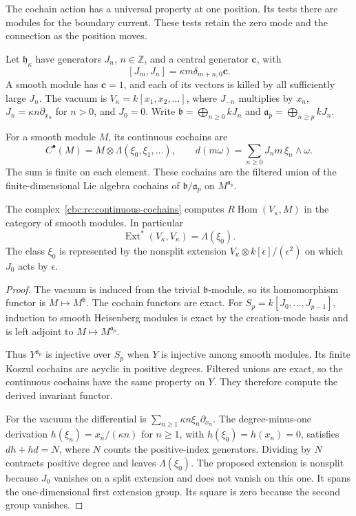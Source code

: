 The cochain action has a universal property at one position.
Its tests there are modules for the boundary current. These
tests retain the zero mode and the connection as the position
moves.

Let $\mathfrak h_\kappa$ have generators $J_n$, $n\in\mathbb Z$,
and a central generator $\mathbf c$, with
\[
 [J_m,J_n]=\kappa m\delta_{m+n,0}\mathbf c.
\]
A smooth module has $\mathbf c=1$, and each of its vectors is
killed by all sufficiently large $J_n$. The vacuum is
$V_\kappa=k[x_1,x_2,\ldots]$, where $J_{-n}$ multiplies by
$x_n$, $J_n=\kappa n\partial_{x_n}$ for $n>0$, and $J_0=0$.
Write $\mathfrak b=\bigoplus_{n\geq0}kJ_n$ and
$\mathfrak a_p=\bigoplus_{n\geq p}kJ_n$.

For a smooth module $M$, its continuous cochains are
\begin{equation}\label{cbc:rc:continuous-cochains}
 C^\bullet(M)=M\otimes\Lambda(\xi_0,\xi_1,\ldots),
 \qquad d(m\omega)=\sum_{n\geq0}J_nm\,\xi_n\wedge\omega.
\end{equation}
The sum is finite on each element. These cochains are the
filtered union of the finite-dimensional Lie algebra
cochains of $\mathfrak b/\mathfrak a_p$ on
$M^{\mathfrak a_p}$.

\begin{lemma}\label{cbc:rc:smooth-ext}
The complex~\eqref{cbc:rc:continuous-cochains} computes
$R\operatorname{Hom}(V_\kappa,M)$ in the category of smooth
modules. In particular
\[
 \operatorname{Ext}^*(V_\kappa,V_\kappa)=\Lambda(\xi_0).
\]
The class $\xi_0$ is represented by the nonsplit extension
$V_\kappa\otimes k[\epsilon]/(\epsilon^2)$ on which $J_0$
acts by $\epsilon$.
\end{lemma}
\begin{proof}
The vacuum is induced from the trivial $\mathfrak b$-module,
so its homomorphism functor is $M\mapsto M^{\mathfrak b}$.
The cochain functors are exact. For
$S_p=k[J_0,\ldots,J_{p-1}]$, induction to smooth Heisenberg
modules is exact by the creation-mode basis and is left
adjoint to $M\mapsto M^{\mathfrak a_p}$.

Thus $Y^{\mathfrak a_p}$ is injective over $S_p$ when $Y$
is injective among smooth modules. Its finite Koszul cochains
are acyclic in positive degrees. Filtered unions are exact,
so the continuous cochains have the same property on $Y$.
They therefore compute the derived invariant functor.

For the vacuum the differential is
$\sum_{n\geq1}\kappa n\xi_n\partial_{x_n}$.
The degree-minus-one derivation
$h(\xi_n)=x_n/(\kappa n)$ for $n\geq1$, with $h(\xi_0)=h(x_n)=0$,
satisfies $dh+hd=N$, where $N$ counts the positive-index
generators. Dividing by $N$ contracts positive degree and
leaves $\Lambda(\xi_0)$. The proposed extension is nonsplit
because $J_0$ vanishes on a split extension and does not vanish
on this one. It spans the one-dimensional first extension
group. Its square is zero because the second group vanishes.
\end{proof}

